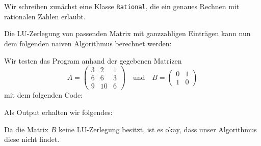 \section{}
\label{section: LU decomposition}

Wir schreiben zunächst eine Klasse \texttt{Rational}, die ein genaues Rechnen mit rationalen Zahlen erlaubt.



Die LU-Zerlegung von passenden Matrix mit ganzzahligen Einträgen kann nun dem folgenden naiven Algorithmus berechnet werden:



Wir testen das Program anhand der gegebenen Matrizen
\[
    A
    = \begin{pmatrix}
        3 &  2 & 1  \\
        6 &  6 & 3  \\
        9 & 10 & 6
      \end{pmatrix}
    \quad\text{und}\quad
    B
    = \begin{pmatrix}
        0 & 1 \\
        1 & 0
      \end{pmatrix}
\]
mit dem folgenden Code:



Als Output erhalten wir folgendes:

Da die Matrix $B$ keine LU-Zerlegung besitzt, ist es okay, dass unser Algorithmus diese nicht findet.
